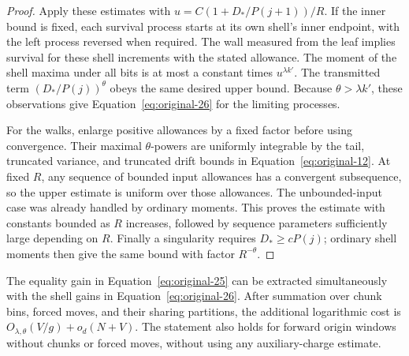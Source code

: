 \begin{proof}
Apply these estimates with
$u=C(1+D_*/P(j+1))/R$.  If the inner bound is fixed, each
survival process starts at its own shell's inner endpoint, with
the left process reversed when required.  The wall measured from
the leaf implies survival for these shell increments with the
stated allowance.  The moment of the shell maxima under all bits
is at most a constant times $u^{\lambda k'}$.  The transmitted
term $(D_*/P(j))^\theta$ obeys the same desired upper bound.
Because $\theta>\lambda k'$, these observations give
Equation~\eqref{eq:original-26} for the limiting processes.

For the walks, enlarge positive allowances by a fixed factor before
using convergence.  Their maximal $\theta$-powers are uniformly
integrable by the tail, truncated variance, and truncated drift
bounds in Equation~\eqref{eq:original-12}.  At fixed $R$, any
sequence of bounded input allowances has a convergent subsequence,
so the upper estimate is uniform over those allowances.  The
unbounded-input case was already handled by ordinary moments.
This proves the estimate with constants bounded as $R$ increases,
followed by sequence parameters sufficiently large depending on
$R$.  Finally a singularity requires
$D_*\ge cP(j)$; ordinary shell moments then give the same bound
with factor $R^{-\theta}$.
\end{proof}

\begin{lemma}
\label{addr:joint-integration}
The equality gain in Equation~\eqref{eq:original-25} can be
extracted simultaneously with the shell gains in
Equation~\eqref{eq:original-26}.  After summation over chunk bins,
forced moves, and their sharing partitions, the additional
logarithmic cost is
$O_{\lambda,\theta}(V/g)+o_d(N+V)$.
The statement also holds for forward origin windows without chunks
or forced moves, without using any auxiliary-charge estimate.
\end{lemma}

